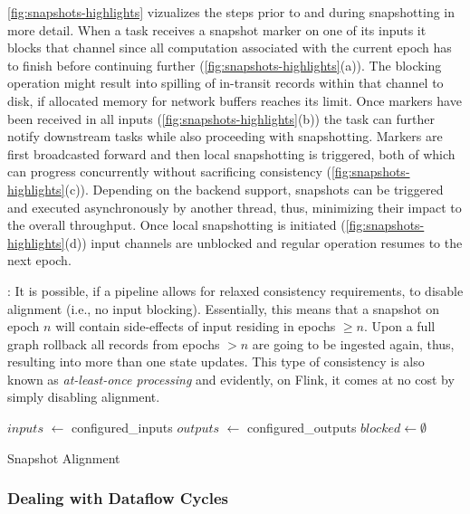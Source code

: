  \autoref{fig:snapshots-highlights} vizualizes the steps prior to and during snapshotting in more detail. When a task receives a snapshot marker on one of its inputs it blocks that channel since all computation associated with the current epoch has to finish before continuing further (\autoref{fig:snapshots-highlights}(a)). The blocking operation might result into spilling of in-transit records within that channel to disk, if allocated memory for network buffers reaches its limit. Once markers have been received in all inputs (\autoref{fig:snapshots-highlights}(b)) the task can further notify downstream tasks while also proceeding with snapshotting. Markers are first broadcasted forward and then local snapshotting is triggered, both of which can progress concurrently without sacrificing consistency (\autoref{fig:snapshots-highlights}(c)). Depending on the backend support, snapshots can be triggered and executed asynchronously by another thread, thus, minimizing their impact to the overall throughput. Once local snapshotting is initiated (\autoref{fig:snapshots-highlights}(d)) input channels are unblocked and regular operation resumes to the next epoch. 

: It is possible, if a pipeline allows for relaxed consistency requirements, to disable alignment (i.e., no input blocking). Essentially, this means that a snapshot on epoch $n$ will contain side-effects of input residing in epochs $\geq n$. Upon a full graph rollback all records from epochs $> n$ are going to be ingested again, thus, resulting into more than one state updates. This type of consistency is also known as \emph{at-least-once processing} and evidently, on Flink, it comes at no cost by simply disabling alignment.


\begin{algorithm}[h]
$inputs$ $\leftarrow$ configured\_inputs\;
$outputs$ $\leftarrow$ configured\_outputs\;
$blocked \leftarrow \emptyset$ \;

\caption{Snapshot Alignment}
\label{alg:snapdag}
\end{algorithm}

\subsubsection{Dealing with Dataflow Cycles}

